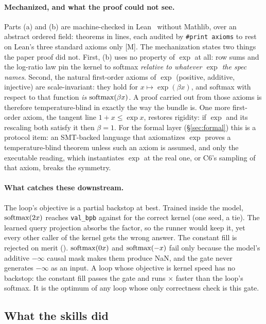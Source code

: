 \paragraph{Mechanized, and what the proof could not see.}
Parts (a) and (b) are machine-checked in Lean~\leanVersion{} without Mathlib, over an abstract
ordered field: \leanTheorems{} theorems in \leanLines{} lines, each audited by
\texttt{\#print axioms} to rest on Lean's three standard axioms only [M]. The
mechanization states two things the paper proof did not. First, (b) uses no property of
$\exp$ at all: row sums and the log-ratio law pin the kernel to softmax \emph{relative to
whatever $\exp$ the spec names}. Second, the \expAxioms{} natural first-order axioms of
$\exp$ (positive, additive, injective) are scale-invariant: they hold for
$x \mapsto \exp(\beta x)$, and softmax with respect to that function \emph{is}
$\operatorname{softmax}(\beta x)$. A proof carried out from those axioms is therefore temperature-blind in
exactly the way the bundle is. One more first-order axiom, the tangent line $1 + x \le \exp x$,
restores rigidity: if $\exp$ and its rescaling both satisfy it then $\beta = 1$. For the
formal layer (\S\ref{sec:formal}) this is a protocol item: an SMT-backed language that
axiomatizes $\exp$ proves a temperature-blind theorem unless such an axiom is assumed, and
only the executable reading, which instantiates $\exp$ at the real one, or C6's sampling of
that axiom, breaks the symmetry.

\paragraph{What catches these downstream.}
The loop's objective is a partial backstop at best. Trained inside the model,
$\operatorname{softmax}(2x)$ reaches \texttt{val\_bpb} \bpbBetaTwo{} against \bpbCorrect{} for the
correct kernel (one seed, a tie). The learned query projection absorbs the factor, so
the runner would keep it, yet every other caller of the kernel gets the wrong answer.
The constant fill is rejected on merit (\bpbFill). $\operatorname{softmax}(0x)$ and $\operatorname{softmax}(-x)$ fail
only because the model's additive $-\infty$ causal mask makes them produce NaN, and the
gate never generates $-\infty$ as an input. A loop whose objective is kernel speed has no
backstop: the constant fill passes the gate and runs \fillSpeedup$\times$ faster than the
loop's softmax. It is the optimum of any loop whose only correctness check is this gate.

\subsection{What the skills did}
\label{sec:skills-results}

